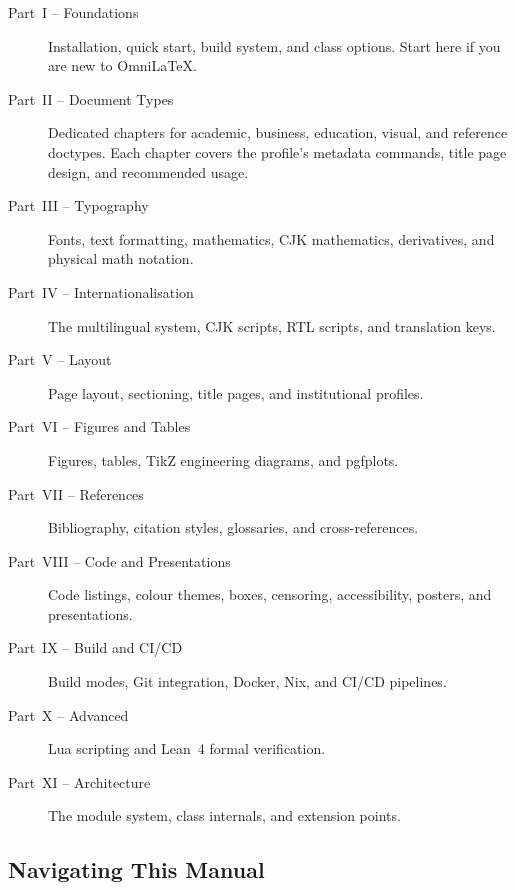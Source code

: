 \begin{description}
    \item[Part~I -- Foundations]
        Installation, quick start, build system, and class options.
        Start here if you are new to OmniLaTeX.
    \item[Part~II -- Document Types]
        Dedicated chapters for academic, business, education, visual, and
        reference doctypes.  Each chapter covers the profile's metadata
        commands, title page design, and recommended usage.
    \item[Part~III -- Typography]
        Fonts, text formatting, mathematics, CJK mathematics, derivatives,
        and physical math notation.
    \item[Part~IV -- Internationalisation]
        The multilingual system, CJK scripts, RTL scripts, and translation
        keys.
    \item[Part~V -- Layout]
        Page layout, sectioning, title pages, and institutional profiles.
    \item[Part~VI -- Figures and Tables]
        Figures, tables, TikZ engineering diagrams, and pgfplots.
    \item[Part~VII -- References]
        Bibliography, citation styles, glossaries, and cross-references.
    \item[Part~VIII -- Code and Presentations]
        Code listings, colour themes, boxes, censoring, accessibility,
        posters, and presentations.
    \item[Part~IX -- Build and CI/CD]
        Build modes, Git integration, Docker, Nix, and CI/CD pipelines.
    \item[Part~X -- Advanced]
        Lua scripting and Lean~4 formal verification.
    \item[Part~XI -- Architecture]
        The module system, class internals, and extension points.
\end{description}

\subsection*{Navigating This Manual}

